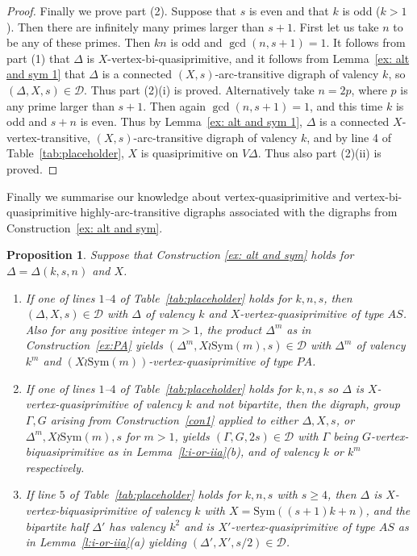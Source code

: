 \documentclass[11pt]{amsart}
\newtheorem{proposition}[theorem]{Proposition}
\newcommand\DD{{\mathscr{D}}}
\newcommand{\Sym}{\mathrm{Sym}}
\begin{document}
\begin{proof}
Finally we prove part (2).  Suppose that $s$ is even and that $k$ is odd ($k>1$). Then there are infinitely many primes larger than $s+1$. First let us take $n$ to be any of these primes. Then $kn$ is odd and $\gcd(n,s+1)=1$. It follows from part (1) that \(\Delta\) is \(X\)-vertex-bi-quasiprimitive,  and it follows from Lemma~\ref{ex: alt and sym 1} that  \(\Delta\) is a connected  \((X,s)\)-arc-transitive digraph of valency $k$, so \((\Delta, X, s)\in\DD\). Thus part (2)(i) is proved. Alternatively take $n=2p$, where $p$ is any prime larger than $s+1$. Then again $\gcd(n,s+1)=1$, and this time $k$ is odd and $s+n$ is even. Thus by  Lemma~\ref{ex: alt and sym 1},  \(\Delta\) is a connected \(X\)-vertex-transitive, \((X,s)\)-arc-transitive digraph of valency $k$, and by line 4 of Table~\ref{tab:placeholder}, $X$ is quasiprimitive on $V\Delta$.  Thus also part (2)(ii) is proved. 
\end{proof}

Finally we summarise our knowledge about vertex-quasiprimitive and vertex-bi-quasiprimitive highly-arc-transitive digraphs associated with the digraphs from Construction~\ref{ex: alt and sym}.

\begin{proposition}\label{ex alt and sym 3}
Suppose that Construction \ref{ex: alt and sym} holds for $\Delta = \Delta(k,s,n)$ and $X$. 
\begin{enumerate}
    \item[(a)] If one of lines $1$--$4$  of Table~\ref{tab:placeholder} holds for $k,n,s$, then  $(\Delta, X, s)\in\DD$ with $\Delta$ of valency $k$ and $X$-vertex-quasiprimitive of type $AS$. Also for any positive integer $m>1$, the product $\Delta^m$ as in Construction~\ref{ex:PA} yields  $(\Delta^m, X\wr \Sym(m),s)\in\DD$ with $\Delta^m$ of valency $k^m$ and $(X\wr \Sym(m))$-vertex-quasiprimitive of type $PA$.

    \item[(b)] If one of lines $1$--$4$  of Table~\ref{tab:placeholder} holds for $k,n,s$ so $\Delta$ is $X$-vertex-quasiprimitive of valency $k$ and not bipartite, then the digraph, group $\Gamma, G$ arising from Construction~\ref{con1} applied to either $\Delta, X, s$, or $\Delta^m, X\wr \Sym(m),s$ for $m>1$, yields $(\Gamma,G,2s)\in\DD$ with $\Gamma$ being $G$-vertex-biquasiprimitive as in Lemma~\ref{l:i-or-iia}(b), and of valency $k$ or $k^m$ respectively.

    \item[(c)] If line $5$ of Table~\ref{tab:placeholder} holds for $k,n,s$  with $s\geq4$, then 
    $\Delta$ is $X$-vertex-biquasiprimitive of valency $k$ with $X=\Sym((s+1)k+n)$, and the bipartite half $\Delta'$ has valency $k^2$ and is $X'$-vertex-quasiprimitive of  type $AS$ as in Lemma~\ref{l:i-or-iia}(a) yielding $(\Delta', X',s/2)\in\DD$.
    
\end{enumerate}
    
\end{proposition}
\end{document}
